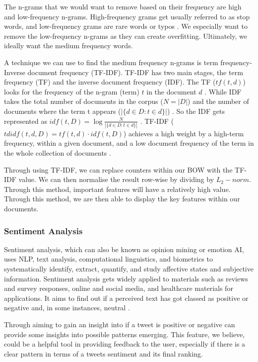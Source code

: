 	The n-grams that we would want to remove based on their frequency are high and low-frequency n-grams. High-frequency grams get usually referred to as stop words, and low-frequency grams are rare words or typos \cite{hapke2019natural}. We especially want to remove the low-frequency n-grams as they can create overfitting. Ultimately, we ideally want the medium frequency words.
	
	A technique we can use to find the medium frequency n-grams is term frequency-Inverse document frequency (TF-IDF). TF-IDF has two main stages, the term frequency (TF) and the inverse document frequency (IDF). The TF ($tf(t,d)$) looks for the frequency of the n-gram (term) $t$ in the document $d$ \cite{sarkar2016text}. While IDF takes the total number of documents in the corpus ($N = |D|$) and the number of documents where the term t appears ($|\{d \in D:t \in d\}|$) \cite{sarkar2016text}. So the IDF gets represented as $idf(t,D) = \log\frac{N}{|\{d \in D:t \in d\}|}$ \cite{sarkar2016text}. TF-IDF ($tdidf(t,d,D) = tf(t,d) \cdot idf(t,D)$) achieves a high weight by a high-term frequency, within a given document, and a low  document frequency of the term in the whole collection of documents \cite{sarkar2016text}.
	
	Through using TF-IDF, we can replace counters within our BOW with the TF-IDF value. We can then normalise the result row-wise by dividing by $L_2-norm$. Through this method, important features will have a relatively high value. Through this method, we are then able to display the key features within our documents.
	
	
	\subsubsection{Sentiment Analysis}
	Sentiment analysis, which can also be known as opinion mining or emotion AI, uses NLP, text analysis, computational linguistics, and biometrics to systematically identify, extract, quantify, and study affective states and subjective information. Sentiment analysis gets widely applied to materials such as reviews and survey responses, online and social media, and healthcare materials for applications. It aims to find out if a perceived text has got classed as positive or negative and, in some instances, neutral \cite{geron2019hands, bird2009natural}.
	
	Through aiming to gain an insight into if a tweet is positive or negative can provide some insights into possible patterns emerging. This feature, we believe, could be a helpful tool in providing feedback to the user, especially if there is a clear pattern in terms of a tweets sentiment and its final ranking.
	
